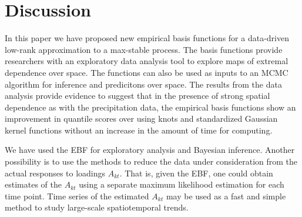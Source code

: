 \documentclass[11pt]{article}
\begin{document}
\section{Discussion}\label{ebs:con}
In this paper we have proposed new empirical basis functions for a data-driven low-rank approximation to a max-stable process.
The basis functions provide researchers with an exploratory data analysis tool to explore maps of extremal dependence over space.
The functions can also be used as inputs to an MCMC algorithm for inference and predicitons over space.
The results from the data analysis provide evidence to suggest that in the presence of strong spatial dependence as with the precipitation data, the empirical basis functions show an improvement in quantile scores over using knots and standardized Gaussian kernel functions without an increase in the amount of time for computing.

We have used the EBF for exploratory analysis and Bayesian inference.
Another possibility is to use the methods to reduce the data under consideration from the actual responses to loadings $A_{kt}$.
That is, given the EBF, one could obtain estimates of the $A_{kt}$ using a separate maximum likelihood estimation for each time point.
Time series of the estimated $A_{kt}$ may be used as a fast and simple method to study large-scale spatiotemporal trends.
\end{document}
